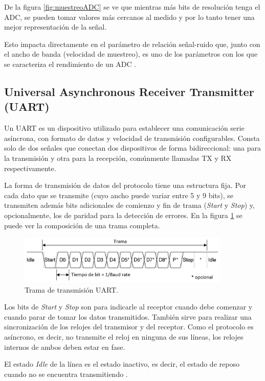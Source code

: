 De la figura \ref{fig:muestreoADC} se ve que mientras más bits de resolución tenga el ADC, se pueden tomar valores más cercanos al medido y por lo tanto tener una mejor representación de la señal.

Esto impacta directamente en el parámetro de relación señal-ruido que, junto con el ancho de banda (velocidad de muestreo), es uno de los parámetros con los que se caracteriza el rendimiento de un ADC \citep{WEBSITE:2}.

\subsection{Universal Asynchronous Receiver Transmitter (UART)}

Un UART es un dispositivo utilizado para establecer una comunicación serie asíncrona, con formato de datos y velocidad de transmisión configurables. Consta solo de dos señales que conectan dos dispositivos de forma bidireccional: una para la transmisión y otra para la recepción, comúnmente llamadas TX y RX respectivamente.

La forma de transmisión de datos del protocolo tiene una estructura fija. Por cada dato que se transmite (cuyo ancho puede variar entre 5 y 9 bits), se transmiten además bits adicionales de comienzo y fin de trama (\textit{Start} y \textit{Stop}) y, opcionalmente, los de paridad para la detección de errores. En la figura \ref{fig:transUART} se puede ver la composición de una trama completa.

\begin{figure}[H]
\centering
\includegraphics[width=0.9\textwidth]{./Figures/UART_frame.png}
\caption{Trama de transmisión UART.}
\label{fig:transUART}
\end{figure}

Los bits de \textit{Start} y \textit{Stop} son para indicarle al receptor cuando debe comenzar y cuando parar de tomar los datos transmitidos. También sirve para realizar una sincronización de los relojes del transmisor y del receptor. Como el protocolo es asíncrono, es decir, no transmite el reloj en ninguna de sus líneas, los relojes internos de ambos deben estar en fase.

El estado \textit{Idle} de la línea es el estado inactivo, es decir, el estado de reposo cuando no se encuentra transmitiendo \citep{WEBSITE:3}.

